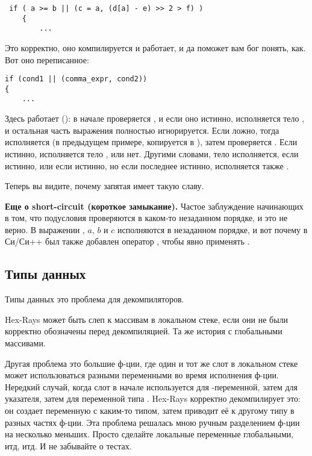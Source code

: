 \begin{lstlisting}
 if ( a >= b || (c = a, (d[a] - e) >> 2 > f) )
    {
    	...
\end{lstlisting}

Это корректно, оно компилируется и работает, и да поможет вам бог понять, как.
Вот оно переписанное:

\begin{lstlisting}
if (cond1 || (comma_expr, cond2))
{
	...
\end{lstlisting}

Здесь работает  (): в начале проверяется , и если оно истинно,
исполняется тело , и остальная часть выражения  полностью игнорируется.
Если  ложно, тогда исполняется  (в предыдущем примере,  копируется в ),
затем проверяется .
Если  истинно, исполняется тело , или нет.
Другими словами, тело  исполняется, если  истинно, или если  истинно,
но если последнее истинно, исполняется также .

Теперь вы видите, почему запятая имеет такую славу.

\textbf{Еще о short-circuit (короткое замыкание).}
Частое заблуждение начинающих в том, что подусловия проверяются в каком-то незаданном порядке, и это не верно.
В выражении , $a$, $b$ и $c$ исполняются в незаданном порядке, и вот почему в Си/Си++ был также добавлен
оператор \TT{||}, чтобы явно применять .

\subsection{Типы данных}

Типы данных это проблема для декомпиляторов.

Hex-Rays может быть слеп к массивам в локальном стеке, если они не были корректно обозначены перед декомпиляцией.
Та же история с глобальными массивами.

Другая проблема это большие ф-ции, где один и тот же слот в локальном стеке может использоваться разными переменными
во время исполнения ф-ции.
Нередкий случай, когда слот в начале используется для -переменной, затем для указателя, затем для переменной типа
.
Hex-Rays корректно декомпилирует это: он создает переменную с каким-то типом, затем приводит её к другому типу в разных частях
ф-ции.
Эта проблема решалась мною ручным разделением ф-ции на несколько меньших.
Просто сделайте локальные переменные глобальными, итд, итд.
И не забывайте о тестах.

